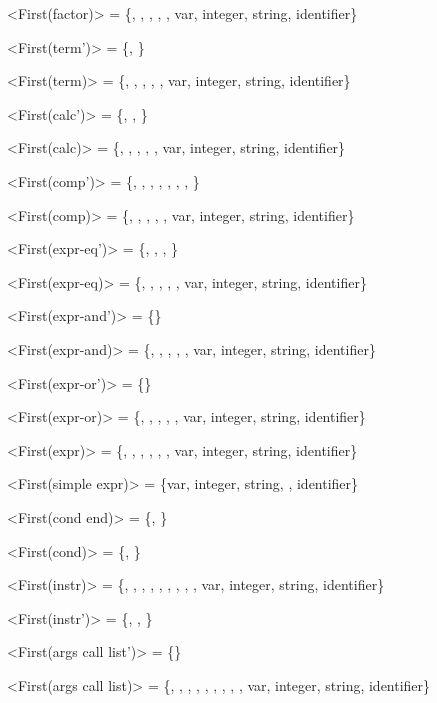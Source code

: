 ﻿<First(factor)>          = \{\lit{(}, \lit{!}, \lit{+}, \lit{-}, \lit{\&}, var, integer, string, identifier\}

<First(term')>           = \{\lit{*}, \lit{/}\}

<First(term)>            = \{\lit{(}, \lit{!}, \lit{+}, \lit{-}, \lit{\&}, var, integer, string, identifier\}

<First(calc')>           = \{\lit{+}, \lit{-}, \}

<First(calc)>            = \{\lit{(}, \lit{!}, \lit{+}, \lit{-}, \lit{\&}, var, integer, string, identifier\}

<First(comp')>           = \{\lit{>}, \lit{\textless}, \lit{>=}, \lit{\textless=}, , , , \}

<First(comp)>            = \{\lit{(}, \lit{!}, \lit{+}, \lit{-}, \lit{\&}, var, integer, string, identifier\}

<First(expr-eq')>        = \{\lit{==}, \lit{!=}, , \}

<First(expr-eq)>         = \{\lit{(}, \lit{!}, \lit{+}, \lit{-}, \lit{\&}, var, integer, string, identifier\}

<First(expr-and')>       = \{\lit{\&\&}\}

<First(expr-and)>        = \{\lit{(}, \lit{!}, \lit{+}, \lit{-}, \lit{\&}, var, integer, string, identifier\}

<First(expr-or')>        = \{\lit{||}\}

<First(expr-or)>         = \{\lit{(}, \lit{!}, \lit{+}, \lit{-}, \lit{\&}, var, integer, string, identifier\}

<First(expr)>            = \{, \lit{(}, \lit{!}, \lit{+}, \lit{-}, \lit{\&}, var, integer, string, identifier\}

<First(simple expr)>     = \{var, integer, string, \lit{\&}, identifier\}

<First(cond end)>        = \{, \}

<First(cond)>            = \{, \}

<First(instr)>           = \{, , , , \lit{(}, \lit{!}, \lit{+}, \lit{-}, \lit{\&}, var, integer, string, identifier\}

<First(instr')>          = \{\lit{=}, , \}

<First(args call list')> = \{\lit{,}\}

<First(args call list)>  = \{, , , , \lit{(}, \lit{!}, \lit{+}, \lit{-}, \lit{\&}, var, integer, string, identifier\}

